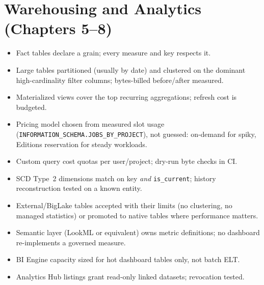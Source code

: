 \section{Warehousing and Analytics (Chapters 5--8)}
\begin{itemize}
    \item[$\square$] Fact tables declare a grain; every measure and key respects it.
    \item[$\square$] Large tables partitioned (usually by date) and clustered on the dominant
    high-cardinality filter columns; bytes-billed before/after measured.
    \item[$\square$] Materialized views cover the top recurring aggregations; refresh cost is
    budgeted.
    \item[$\square$] Pricing model chosen from measured slot usage
    (\texttt{INFORMATION\_SCHEMA.JOBS\_BY\_PROJECT}), not guessed: on-demand for spiky, Editions
    reservation for steady workloads.
    \item[$\square$] Custom query cost quotas per user/project; dry-run byte checks in CI.
    \item[$\square$] SCD Type~2 dimensions match on key \emph{and} \texttt{is\_current}; history
    reconstruction tested on a known entity.
    \item[$\square$] External/BigLake tables accepted with their limits (no clustering, no managed
    statistics) or promoted to native tables where performance matters.
    \item[$\square$] Semantic layer (LookML or equivalent) owns metric definitions; no dashboard
    re-implements a governed measure.
    \item[$\square$] BI Engine capacity sized for hot dashboard tables only, not batch ELT.
    \item[$\square$] Analytics Hub listings grant read-only linked datasets; revocation tested.
\end{itemize}

